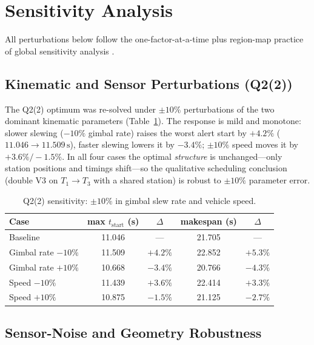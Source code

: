 \section{Sensitivity Analysis}\label{sec:sens}

All perturbations below follow the one-factor-at-a-time plus region-map practice of
global sensitivity analysis \cite{saltelli2008}.

\subsection{Kinematic and Sensor Perturbations (Q2(2))}

The Q2(2) optimum was re-solved under $\pm10\%$ perturbations of the two dominant
kinematic parameters (Table~\ref{tab:sens}). The response is mild and monotone:
slower slewing ($-10\%$ gimbal rate) raises the worst alert start by
$+4.2\%$ ($11.046\to11.509\,\mathrm{s}$), faster slewing lowers it by $-3.4\%$;
$\pm10\%$ speed moves it by $+3.6\%/-1.5\%$. In all four cases the optimal
\emph{structure} is unchanged---only station positions and timings shift---so the
qualitative scheduling conclusion (double V3 on $T_1\!\to\!T_3$ with a shared station)
is robust to $\pm10\%$ parameter error.

\begin{table}[!htb]\centering\footnotesize
\caption{Q2(2) sensitivity: $\pm10\%$ in gimbal slew rate and vehicle speed.}
\label{tab:sens}
\begin{tabular}{lcccc}
\toprule
Case & max $t_{\mathrm{start}}$ (s) & $\Delta$ & makespan (s) & $\Delta$ \\
\midrule
Baseline                & 11.046 & ---    & 21.705 & ---    \\
Gimbal rate $-10\%$     & 11.509 & $+4.2\%$ & 22.852 & $+5.3\%$ \\
Gimbal rate $+10\%$     & 10.668 & $-3.4\%$ & 20.766 & $-4.3\%$ \\
Speed $-10\%$           & 11.439 & $+3.6\%$ & 22.414 & $+3.3\%$ \\
Speed $+10\%$           & 10.875 & $-1.5\%$ & 21.125 & $-2.7\%$ \\
\bottomrule
\end{tabular}
\end{table}

\subsection{Sensor-Noise and Geometry Robustness}

